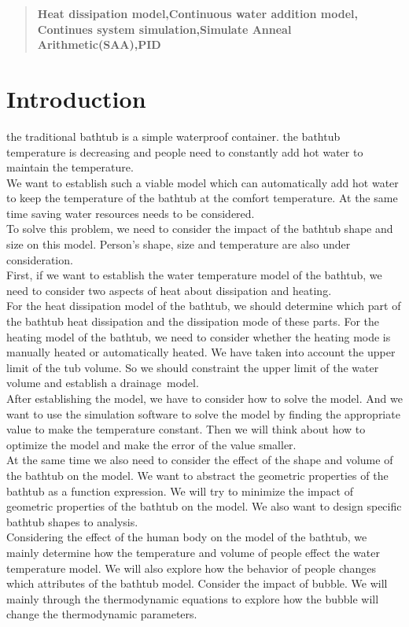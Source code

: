 \documentclass{mcmthesis}
\begin{document}
\begin{abstract}
\begin{keywords}
 \textbf{Heat dissipation model,\indent Continuous water addition model, Continues system simulation,\indent Simulate Anneal Arithmetic(SAA),\indent PID}
\end{keywords}
\end{abstract}

\maketitle
\tableofcontents\thispagestyle{empty}


\setcounter{page}{1}
\section{Introduction}
\indent the traditional bathtub is a simple waterproof container.
the bathtub temperature is decreasing and people need to constantly add hot water to maintain the temperature.\\
\indent We want to establish such a viable model which can automatically add hot water to keep the temperature of the bathtub at the comfort temperature. At the same time saving water resources needs to be considered.\\
\indent To solve this problem, we need to consider the impact of the bathtub shape and size on this model. Person's shape, size and temperature are also under consideration.\\
\indent First, if we want to establish the water temperature model of the bathtub, we need to consider two aspects of heat about dissipation and heating.\\
\indent For the heat dissipation model of the bathtub, we should determine which part of the bathtub heat dissipation and the dissipation mode of these parts. For the heating model of the bathtub, we need to consider whether the heating mode is manually heated or automatically heated. We have taken into account the upper limit of the tub volume. So we should constraint the upper limit of the water volume and establish a drainage model.\\
\indent After establishing the model, we have to consider how to solve the model. And we want to use the simulation software to solve the model by finding the appropriate value to make the temperature constant. Then we will think about how to optimize the model and make the error of the value smaller. \\
\indent At the same time we also need to consider the effect of the shape and volume of the bathtub on the model. We want to abstract the geometric properties of the bathtub as a function expression. We will try to minimize the impact of geometric properties of the bathtub on the model. We also want to design specific bathtub shapes to analysis.\\
\indent Considering the effect of the human body on the model of the bathtub, we mainly determine how the temperature and volume of people effect the water temperature model. We will also explore how the behavior of people changes which attributes of the bathtub model.
Consider the impact of bubble. We will mainly through the thermodynamic equations to explore how the bubble will change the thermodynamic parameters.
\end{document}
